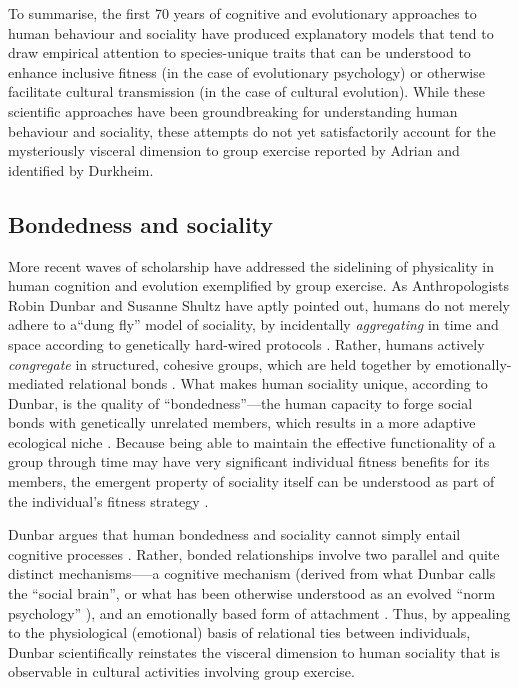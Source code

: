 \begin{CJK}{UTF8}{gbsn}
To summarise, the first 70 years of cognitive and evolutionary approaches to human behaviour and sociality have produced explanatory models that tend to draw empirical attention to species-unique traits that can be understood to enhance inclusive fitness (in the case of evolutionary psychology) or otherwise facilitate cultural transmission (in the case of cultural evolution).  While these scientific approaches have been groundbreaking for understanding human behaviour and sociality, these attempts do not yet satisfactorily account for the mysteriously visceral dimension to group exercise reported by Adrian and identified by Durkheim.


\subsection{Bondedness and sociality\label{sect:bondednessSociality}}
More recent waves of scholarship have addressed the sidelining of physicality in human cognition and evolution exemplified by group exercise.  As Anthropologists Robin Dunbar and Susanne Shultz have aptly pointed out, humans do not merely adhere to a``dung fly'' model of sociality, by incidentally \textit{aggregating} in time and space according to genetically hard-wired protocols \citep[see][]{Wilson1975}.  Rather, humans actively \textit{congregate} in structured, cohesive groups, which are held together by emotionally-mediated relational bonds \citep[777]{Dunbar2010}.  What makes human sociality unique, according to Dunbar, is the quality of ``bondedness''---the human capacity to forge social bonds with genetically unrelated members, which results in a more adaptive ecological niche \citep[see][]{Odling-Smee2003}.
Because being able to maintain the effective functionality of a group through time may have very significant individual fitness benefits for its members, the emergent property of sociality itself can be understood as part of the individual’s fitness strategy \citep{Dunbar2010b,Nowak2010}.

Dunbar argues that human bondedness and sociality cannot simply entail cognitive processes \citep[at least not in the way cognitive processes are narrowly rendered by game-theoretic and gene-culture coevolutionary models][]{Dunbar2010}.  Rather, bonded relationships involve two parallel and quite distinct mechanisms—--a cognitive mechanism (derived from what Dunbar calls the ``social brain''\citep{Dunbar1998}, or what has been otherwise understood as an evolved ``norm psychology'' \citep{Chudek2011}), and an emotionally based form of attachment \citep[often involving a psycho-pharmacological mechanism][]{Dunbar2010b}.  Thus, by appealing to the physiological (emotional) basis of relational ties between individuals, Dunbar scientifically reinstates the visceral dimension to human sociality that is observable in cultural activities involving group exercise.


\end{CJK}
